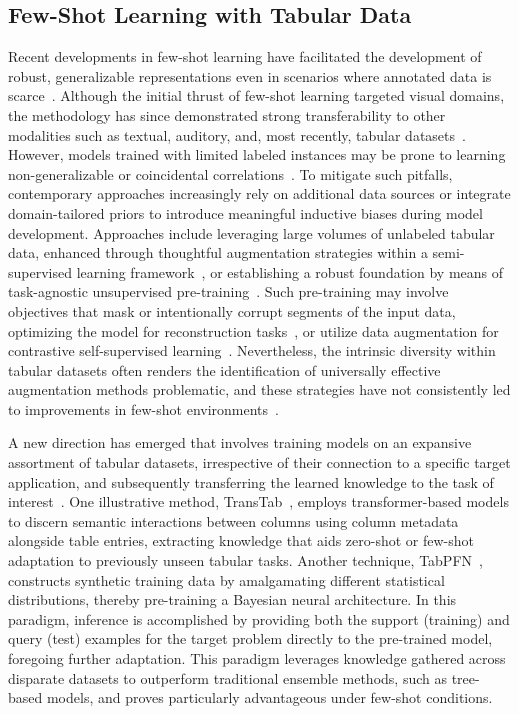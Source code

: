 \subsection{Few-Shot Learning with Tabular Data} Recent developments in few-shot learning have facilitated the development of robust, generalizable representations even in scenarios where annotated data is scarce~\cite{chen2018closer}. Although the initial thrust of few-shot learning targeted visual domains, the methodology has since demonstrated strong transferability to other modalities such as textual, auditory, and, most recently, tabular datasets~\cite{majumder2022few,nam2023stunt,schick2021exploiting}. However, models trained with limited labeled instances may be prone to learning non-generalizable or coincidental correlations~\cite{bartlett2021deep}. To mitigate such pitfalls, contemporary approaches increasingly rely on additional data sources or integrate domain-tailored priors to introduce meaningful inductive biases during model development. Approaches include leveraging large volumes of unlabeled tabular data, enhanced through thoughtful augmentation strategies within a semi-supervised learning framework~\cite{ucar2021subtab,yoon2020vime}, or establishing a robust foundation by means of task-agnostic unsupervised pre-training~\cite{somepalli2021saint}. Such pre-training may involve objectives that mask or intentionally corrupt segments of the input data, optimizing the model for reconstruction tasks~\cite{arik2021tabnet,majmundar2022met}, or utilize data augmentation for contrastive self-supervised learning~\cite{bahri2022scarf,chen2020simple}. Nevertheless, the intrinsic diversity within tabular datasets often renders the identification of universally effective augmentation methods problematic, and these strategies have not consistently led to improvements in few-shot environments~\cite{nam2023stunt}.

A new direction has emerged that involves training models on an expansive assortment of tabular datasets, irrespective of their connection to a specific target application, and subsequently transferring the learned knowledge to the task of interest~\cite{zhang2023generative,levin2022transfer,zhu2023xtab}. One illustrative method, TransTab~\cite{wang2022transtab}, employs transformer-based models to discern semantic interactions between columns using column metadata alongside table entries, extracting knowledge that aids zero-shot or few-shot adaptation to previously unseen tabular tasks. Another technique, TabPFN~\cite{hollmann2022tabpfn}, constructs synthetic training data by amalgamating different statistical distributions, thereby pre-training a Bayesian neural architecture. In this paradigm, inference is accomplished by providing both the support (training) and query (test) examples for the target problem directly to the pre-trained model, foregoing further adaptation. This paradigm leverages knowledge gathered across disparate datasets to outperform traditional ensemble methods, such as tree-based models, and proves particularly advantageous under few-shot conditions.

